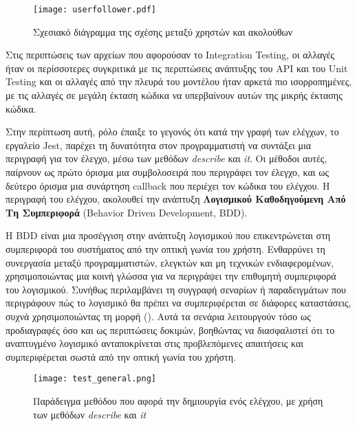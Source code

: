   \begin{figure}[H]
    \begin{center}
      \texttt{[image: userfollower.pdf]}
      \caption{Σχεσιακό διάγραμμα της σχέσης μεταξύ χρηστών και ακολούθων}
    \end{center}
    \label{fig:userFollower}
  \end{figure}

  Στις περιπτώσεις των αρχείων που αφορούσαν το \textlatin{Integration
  Testing}, οι αλλαγές ήταν οι περίσσοτερες συγκριτικά με τις
  περιπτώσεις ανάπτυξης του \textlatin{API} και του \textlatin{Unit
  Testing} και οι αλλαγές από την πλευρά του μοντέλου ήταν αρκετά πιο
  ισορροπημένες, με τις αλλαγές σε μεγάλη έκταση κώδικα να υπερβαίνουν
  αυτών της μικρής έκτασης κώδικα.

  Στην περίπτωση αυτή, ρόλο έπαιξε το γεγονός ότι κατά την γραφή των
  ελέγχων, το εργαλείο \textlatin{Jest}, παρέχει τη δυνατότητα στον
  προγραμματιστή να συντάξει μια περιγραφή για τον έλεγχο, μέσω των
  μεθόδων \textit{\textlatin{describe}} και \textit{\textlatin{it}}. Οι
  μέθοδοι αυτές, παίρνουν ως πρώτο όρισμα μια συμβολοσειρά που περιγράφει
  τον έλεγχο, και ως δεύτερο όρισμα μια συνάρτηση \textlatin{callback}
  \cite{crockfordjavascript} που περιέχει τον κώδικα του ελέγχου. Η
  περιγραφή του ελέγχου, ακολουθεί την ανάπτυξη \textbf{Λογισμικού
  Καθοδηγούμενη Από Τη Συμπεριφορά} (\textlatin{Behavior Driven
  Development, BDD}).

  Η \textlatin{BDD} είναι μια προσέγγιση στην ανάπτυξη λογισμικού που
  επικεντρώνεται στη συμπεριφορά του συστήματος από την οπτική γωνία του
  χρήστη. Ενθαρρύνει τη συνεργασία μεταξύ προγραμματιστών, ελεγκτών και μη
  τεχνικών ενδιαφερομένων, χρησιμοποιώντας μια κοινή γλώσσα για να
  περιγράψει την επιθυμητή συμπεριφορά του λογισμικού. Συνήθως
  περιλαμβάνει τη συγγραφή σεναρίων ή παραδειγμάτων που περιγράφουν πώς το
  λογισμικό θα πρέπει να συμπεριφέρεται σε διάφορες καταστάσεις, συχνά
  χρησιμοποιώντας τη μορφή 
  (). Αυτά τα σενάρια λειτουργούν τόσο ως
  προδιαγραφές όσο και ως περιπτώσεις δοκιμών, βοηθώντας να διασφαλιστεί
  ότι το αναπτυγμένο λογισμικό ανταποκρίνεται στις προβλεπόμενες
  απαιτήσεις και συμπεριφέρεται σωστά από την οπτική γωνία του χρήστη.
  \cite{bddstudy,mughal2024advancingbddsoftwaretesting,bddsystematic}

  \begin{figure}[H]
    \begin{center}
      \texttt{[image: test\_general.png]}
      \caption{Παράδειγμα μεθόδου που αφορά την δημιουργία ενός ελέγχου,
        με χρήση των μεθόδων \textit{\textlatin{describe}} και
      \textit{\textlatin{it}}}
    \end{center}
    \label{fig:TestGeneral}
  \end{figure}

